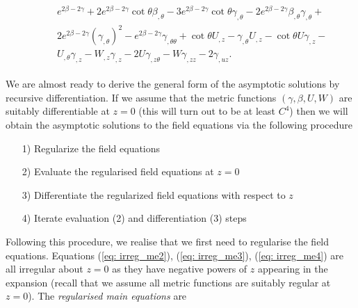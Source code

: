 \documentclass[a4paper,11pt]{article}
\numberwithin{equation}{section}
\begin{document}
\begin{subequations}
\begin{align}
\begin{split}
& \phantom{aaa} e^{2\beta-2\gamma}+ 2 e^{2\beta - 2\gamma} \cot \theta \beta_{, \theta} - 3 e^{2\beta -2\gamma}\cot \theta \gamma_{, \theta}-2e^{2\beta -2\gamma}\beta_{, \theta} \gamma_{, \theta} + \\
& \phantom{aaa} 2e^{2\beta -2\gamma}(\gamma_{, \theta})^2-e^{2\beta -2\gamma}\gamma_{, \theta \theta}+\cot \theta U_{, z} -\gamma_{, \theta} U_{,z}-\cot \theta U \gamma_{, z}-\\
& \phantom{aaa} U_{, \theta} \gamma_{, z} - W_{,z}\gamma_{,z}-2U \gamma_{,z \theta} - W\gamma_{,zz}-2\gamma_{, u z}  \label{eq: irreg_me4}.
\end{split}
\end{align}
\end{subequations}

We are almost ready to derive the general form of the asymptotic solutions by recursive differentiation. If we assume that the metric functions $(\gamma, \beta, U, W)$ are suitably differentiable at $z=0$ (this will turn out to be at least $C^4$) then we will obtain the asymptotic solutions to the field equations via the following procedure 

\begin{itemize}
\item[1)] Regularize the field equations
\item[2)] Evaluate the regularised field equations at $z=0$
\item[3)] Differentiate the regularized field equations with respect to $z$ 
\item[4)] Iterate evaluation (2) and differentiation (3) steps 
\end{itemize}

Following this procedure, we realise that we first need to regularise the field equations. Equations (\ref{eq: irreg_me2}), (\ref{eq: irreg_me3}), (\ref{eq: irreg_me4}) are all irregular about $z=0$ as they have negative powers of $z$ appearing in the expansion (recall that we assume all metric functions are suitably regular at $z=0$). The \textit{regularised main equations} are 
\end{document}
